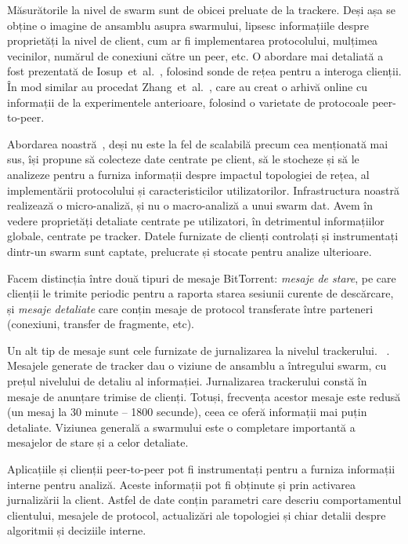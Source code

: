 Măsurătorile la nivel de swarm sunt de obicei preluate de la trackere. Deși
așa se obține o imagine de ansamblu asupra swarmului, lipsesc informațiile
despre proprietăți la nivel de client, cum ar fi implementarea protocolului,
mulțimea vecinilor, numărul de conexiuni către un peer, etc. O abordare
mai detaliată a fost prezentată de 
Iosup~et~al.~\cite{corr-overlay}, folosind sonde de rețea pentru a interoga
clienții. În mod similar au procedat
Zhang~et~al.~\cite{p2p-trace-archive}, care au creat o arhivă online cu
informații de la experimentele anterioare, folosind o varietate de protocoale
peer-to-peer.

Abordarea noastră~\cite{enhanced-logging}, deși nu este la fel de scalabilă
precum cea menționată mai sus, își propune să colecteze date centrate
pe client, să le stocheze și să le analizeze pentru a furniza informații
despre impactul topologiei de rețea, al implementării protocolului și
caracteristicilor utilizatorilor. Infrastructura noastră realizează o
micro-analiză, și nu o macro-analiză a unui swarm dat. Avem în vedere
proprietăți detaliate centrate pe utilizatori, în detrimentul informațiilor
globale, centrate pe tracker. Datele furnizate de clienți controlați și
instrumentați dintr-un swarm sunt captate, prelucrate și stocate pentru
analize ulterioare.

Facem distincția între două tipuri de mesaje BitTorrent:
\textit{mesaje de stare}, pe care clienții le trimite periodic pentru a
raporta starea sesiunii curente de descărcare, și \textit{mesaje detaliate}
care conțin mesaje de protocol transferate între parteneri (conexiuni,
transfer de fragmente, etc).

Un alt tip de mesaje sunt cele furnizate de jurnalizarea la nivelul trackerului.
~\cite{tracker-mon}. Mesajele generate de tracker dau o viziune de ansamblu a
întregului swarm, cu prețul nivelului de detaliu al informației. Jurnalizarea
trackerului constă în mesaje de anunțare trimise de clienți. Totuși,
frecvența acestor mesaje este redusă (un mesaj la 30 minute -- 1800 secunde),
ceea ce oferă informații mai puțin detaliate. Viziunea generală a swarmului
este o completare importantă a mesajelor de stare și a celor detaliate.

Aplicațiile și clienții peer-to-peer pot fi instrumentați pentru a furniza
informații interne pentru analiză. Aceste informații pot fi obținute și prin
activarea jurnalizării la client. Astfel de date conțin parametri care descriu
comportamentul clientului, mesajele de protocol, actualizări ale topologiei
și chiar detalii despre algoritmii și deciziile interne.

